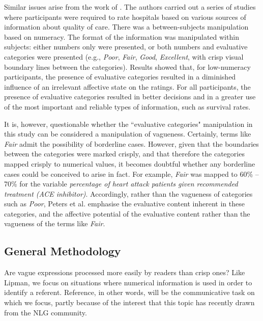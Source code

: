 \documentclass[%
man,		%
floatsintext,%
apacite%
]{apa6}
\begin{document}
Similar issues arise from the work of . The authors carried out a series of studies where participants were required to rate hospitals based on various sources of information about quality of care. There was a between-subjects manipulation based on numeracy. The format of the information was manipulated within subjects: either numbers only were presented, or both numbers and evaluative categories were presented (e.g., \emph{Poor}, \emph{Fair}, \emph{Good}, \emph{Excellent}, with crisp visual boundary lines between the categories). Results showed that, for low-numeracy participants, the presence of evaluative categories resulted in a diminished influence of an irrelevant affective state on the ratings. For all participants, the presence of evaluative categories resulted in better decisions and in a greater use of the most important and reliable types of information, such as survival rates. 

It is, however, questionable whether the ``evaluative categories" manipulation in this study can be considered a manipulation of vagueness. Certainly, terms like \emph{Fair} admit the possibility of borderline cases. However, given that the boundaries between the categories were marked crisply, and that therefore the categories mapped crisply to numerical values, it becomes doubtful whether any borderline cases could be conceived to arise in fact. For example, \emph{Fair} was mapped to 60\% -- 70\% for the variable \emph{percentage of heart attack patients given recommended treatment (ACE inhibitor)}. Accordingly, rather than the vagueness of categories such as \emph{Poor}, Peters et al. emphasise the evaluative content inherent in these categories, and the affective potential of the evaluative content rather than the vagueness of the terms like {\em Fair}.

\subsection{General Methodology}\label{method}

Are vague expressions processed more easily by readers than crisp ones? 
Like Lipman, we focus on situations where numerical information is used in order to identify a referent. 
Reference, in other words, will be the communicative task on which we focus, partly because of the interest that this topic has recently drawn from the NLG community.  
\end{document}
